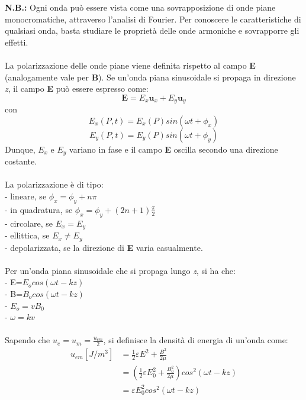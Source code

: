 \documentclass{article}
\begin{document}
\textbf{N.B.:} Ogni onda può essere vista come una sovrapposizione di onde piane monocromatiche, attraverso l'analisi di Fourier. Per conoscere le caratteristiche di qualsiasi onda, basta studiare le proprietà delle onde armoniche e sovrapporre gli effetti.\\
\\
La polarizzazione delle onde piane viene definita rispetto al campo \textbf{E} (analogamente vale per \textbf{B}). Se un'onda piana sinusoidale si propaga in direzione \emph{z}, il campo \textbf{E} può essere espresso come:
\begin{equation}
\textbf{E}= E_x\textbf{u}_x + E_y\textbf{u}_y
\nonumber
\end{equation}
con
\begin{equation}
E_x(P,t)=E_x(P) sin(\omega t + \phi_x)
\nonumber
\end{equation}
\begin{equation}
E_y(P,t)=E_y(P) sin(\omega t + \phi_y)
\nonumber
\end{equation}
Dunque, $E_x$ e $E_y$ variano in fase e il campo \textbf{E} oscilla secondo una direzione costante.\\
\\
La polarizzazione è di tipo:\\
- lineare, se $\phi_x=\phi_y + n\pi$ \\
- in quadratura, se $\phi_x=\phi_y + (2n+1)\frac{\pi}{2}$ \\
- circolare, se $E_x = E_y$ \\
- ellittica, se $E_x \neq E_y$ \\
- depolarizzata, se la direzione di \textbf{E} varia casualmente.\\
\\
Per un’onda piana sinusoidale che si propaga lungo \emph{z}, si ha che:\\
- E=$E_ocos(\omega t - kz)$\\
- B=$B_ocos(\omega t - kz)$\\
- $E_o = vB_0$ \\
- $\omega = kv$ \\
\\
Sapendo che $u_e=u_m=\frac{u_{em}}{2}$, si definisce la densità di energia di un'onda come:
\begin{equation}
\begin{split}
u_{em}[J/m^3] &= \frac{1}{2} \varepsilon E^2 + \frac{B^2}{2\mu} \\
&= \left(\frac{1}{2} \varepsilon E_0^2 + \frac{B_0^2}{2\mu}\right)cos^2(\omega t - kz) \\
&= \varepsilon E_0^2cos^2(\omega t - kz)
\end{split}
\end{equation}
\end{document}
